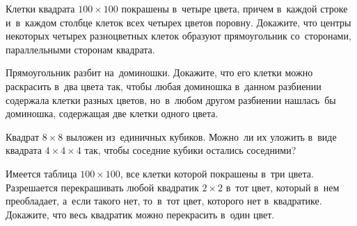\begin{problems}
\item
Клетки квадрата $100 \times 100$ покрашены в~четыре цвета, причем в~каждой
строке и~в~каждом столбце клеток всех четырех цветов поровну.
Докажите, что центры некоторых четырех разноцветных клеток образуют
прямоугольник со~сторонами, параллельными сторонам квадрата.

\item
Прямоугольник разбит на~доминошки.
Докажите, что его клетки можно раскрасить в~два цвета так, чтобы любая
доминошка в~данном разбиении содержала клетки разных цветов, но~в~любом другом
разбиении нашлась~бы доминошка, содержащая две клетки одного цвета.

\item
Квадрат $8 \times 8$ выложен из~единичных кубиков.
Можно~ли их уложить в~виде квадрата $4 \times 4 \times 4$ так, чтобы соседние
кубики остались соседними?

\item
Имеется таблица $100 \times 100$, все клетки которой покрашены в~три цвета.
Разрешается перекрашивать любой квадратик $2 \times 2$ в~тот цвет, который
в~нем преобладает, а~если такого нет, то~в~тот цвет, которого нет в~квадратике.
Докажите, что весь квадратик можно перекрасить в~один цвет.

\end{problems}

